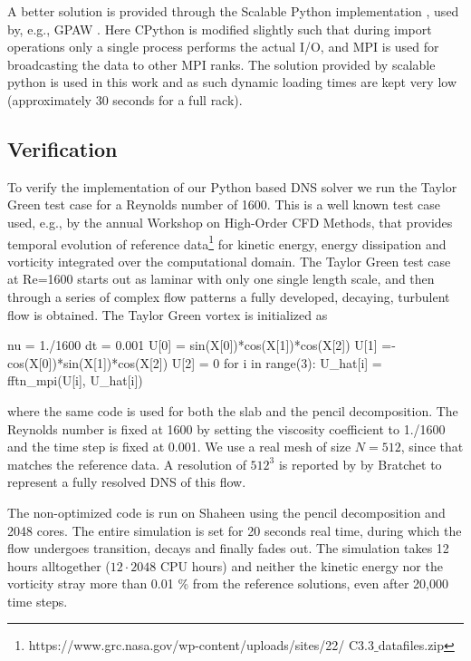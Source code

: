 \documentclass[11pt, oneside]{article}
\begin{document}
A better solution is provided through the Scalable Python implementation \cite{scalablepython, Enkovaara201117}, used by, e.g., GPAW \cite{gpaw05}. Here CPython is modified slightly such that during import operations only a single process performs the actual I/O, and MPI is used for broadcasting the data to other MPI ranks. The solution provided by scalable python is used in this work and as such dynamic loading times are kept very low (approximately 30 seconds for a full rack).

\subsection{Verification}
\label{sec:verification}
To verify the implementation of our Python based DNS solver we run the Taylor Green test case for a Reynolds number of 1600. This is a well known test case used, e.g., by the annual Workshop on High-Order CFD Methods, that provides temporal evolution of reference data\footnote{https://www.grc.nasa.gov/wp-content/uploads/sites/22/ C3.3$\_$datafiles.zip} for kinetic energy, energy dissipation and vorticity integrated over the computational domain. The Taylor Green test case at Re=1600 starts out as laminar with only one single length scale, and then through a series of complex flow patterns a fully developed, decaying, turbulent flow is obtained. The Taylor Green vortex is initialized as
\begin{python}
nu = 1./1600
dt = 0.001
U[0] = sin(X[0])*cos(X[1])*cos(X[2])
U[1] =-cos(X[0])*sin(X[1])*cos(X[2])
U[2] = 0 
for i in range(3):
    U_hat[i] = fftn_mpi(U[i], U_hat[i])
\end{python}
where the same code is used for both the slab and the pencil decomposition. The Reynolds number is fixed at 1600 by setting the viscosity coefficient to 1./1600 and the time step is fixed at 0.001. We use a real mesh of size $N=512$, since that matches the reference data. A resolution of $512^3$ is reported by by Bratchet \cite{brachet1991direct} to represent a fully resolved DNS of this flow. 

The non-optimized code is run on Shaheen using the pencil decomposition and 2048 cores. The entire simulation is set for 20 seconds real time, during which the flow undergoes transition, decays and finally fades out. The simulation takes 12 hours alltogether ($12\cdot2048$ CPU hours) and neither the kinetic energy nor the vorticity stray more than 0.01 \% from the reference solutions, even after 20,000 time steps.
\end{document}
